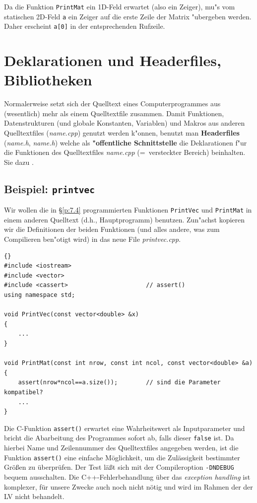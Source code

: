 Da die Funktion \verb|PrintMat|
\enlargethispage{4ex}
ein 1D-Feld erwartet (also ein Zeiger),
mu"s vom statischen 2D-Feld \verb|a| ein Zeiger auf die erste
Zeile der Matrix "ubergeben werden.
Daher erscheint \verb|a[0]| in der entsprechenden Rufzeile.
\fi{}
%
%
%
%
\section{Deklarationen und Headerfiles, Bibliotheken}
\label{p:7.5}
%
Normalerweise setzt sich der Quelltext eines Computerprogrammes aus
(wesentlich) mehr als einem Quelltextfile zusammen. Damit Funktionen,
Datenstrukturen (und globale Konstanten, Variablen) und Makros
aus anderen Quelltextfiles (\textit{name.cpp})
genutzt werden k"onnen, benutzt man
\textbf{Headerfiles} (\textit{name.h}, \textit{name.h}) welche als \textbf{"offentliche Schnittstelle}
die Deklarationen f"ur die Funktionen des  Quelltextfiles \textit{name.cpp}
(=~versteckter Bereich) beinhalten.
Sie dazu \cite[\S8.1]{Wolf:2006:CAZ}.
\\[-4ex]
\enlargethispage{3ex}
%
%
\subsection{Beispiel: \texttt{printvec}}
\label{p:7.5.1}
%
Wir wollen die in \S\ref{p:7.4} programmierten Funktionen
\texttt{PrintVec} und \texttt{PrintMat} in einem anderen Quelltext
(d.h., Hauptprogramm) benutzen.
Zun"achst kopieren wir die Definitionen der beiden Funktionen
(und alles andere, was zum Compilieren ben"otigt wird) in
das neue File \textit{printvec.cpp}.
%
\begin{lstlisting}[caption=Implementierungsteil der Print-Funktionen,label=lst:7_6_1,basicstyle=\scriptsize]{}
#include <iostream>
#include <vector>
#include <cassert>                      // assert()
using namespace std;

void PrintVec(const vector<double> &x)
{
    ...
}

void PrintMat(const int nrow, const int ncol, const vector<double> &a)
{
    assert(nrow*ncol==a.size());        // sind die Parameter kompatibel?
    ...
}
\end{lstlisting}
%
Die C-Funktion \texttt{assert()} erwartet eine Wahrheitswert als Inputparameter 
und bricht die Abarbeitung des Programmes sofort ab, falls dieser \texttt{false} ist.
Da hierbei Name und Zeilennummer des Quelltextfiles angegeben werden, ist die Funktion
\texttt{assert()} eine einfache Möglichkeit, um die Zulässigkeit bestimmter Größen zu überprüfen.
Der Test läßt sich mit der Compileroption \texttt{-DNDEBUG} bequem ausschalten.
Die C++-Fehlerbehandlung über das \emph{exception handling} ist komplexer,
für unsere Zwecke auch noch nicht nötig und
wird im Rahmen der der LV nicht behandelt.

